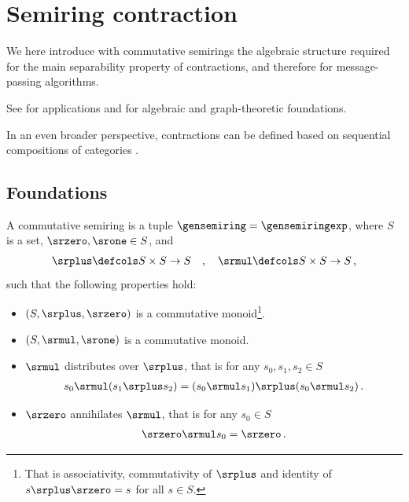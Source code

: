 \section{Semiring contraction}

We here introduce with commutative semirings the algebraic structure required for the main separability property of contractions, and therefore for message-passing algorithms.

See \cite{liu_computing_2023,liu_tropical_2021} for applications and \cite{gondran_graphs_2008} for algebraic and graph-theoretic foundations.

In an even broader perspective, contractions can be defined based on sequential compositions of categories \cite{tull_towards_2024}.

\subsection{Foundations}

\begin{definition}
    A commutative semiring is a tuple $\gensemiring=\gensemiringexp$, where $S$ is a set, $\srzero,\srone\in S$, and
    \begin{align*}
        \srplus \defcols S \times S \rightarrow S
        \quad, \quad
        \srmul \defcols S \times S \rightarrow S \, ,
    \end{align*}
    such that the following properties hold:
    \begin{itemize}
        \setlength{\labelwidth}{1.8em}
        \setlength{\leftmargin}{1.8em}
        \setlength{\itemindent}{0em}
        \item[(i)] $(S,\srplus,\srzero)$ is a commutative monoid\footnote{That is associativity, commutativity of $\srplus$ and identity of $s\srplus \srzero=s$ for all $s\in S$.}.
        \item[(ii)] $(S,\srmul,\srone)$ is a commutative monoid.
        \item[(iii)] $\srmul$ distributes over $\srplus$, that is for any $s_0,s_1,s_2\in S$
        \begin{align*}
            s_0 \srmul (s_1 \srplus s_2)
            = (s_0 \srmul s_1) \srplus (s_0 \srmul s_2) \, .
        \end{align*}
        \item[(iv)] $\srzero$ annihilates $\srmul$, that is for any $s_0\in S$
        \begin{align*}
            \srzero \srmul s_0 = \srzero \, .
        \end{align*}
    \end{itemize}
\end{definition}

